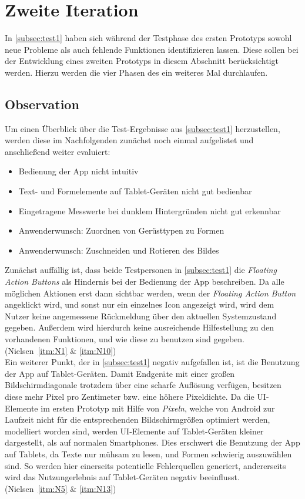 \chapter{Zweite Iteration}\label{chap:pro2}
In \autoref{subsec:test1} haben sich während der Testphase des ersten Prototyps sowohl neue Probleme als auch fehlende Funktionen identifizieren lassen.
Diese sollen bei der Entwicklung eines zweiten Prototyps in diesem Abschnitt berücksichtigt werden. 
Hierzu werden die vier Phasen des \hcdp{} ein weiteres Mal durchlaufen.

\section{Observation}
Um einen Überblick über die Test-Ergebnisse aus \autoref{subsec:test1} herzustellen, werden diese im Nachfolgenden zunächst noch einmal aufgelistet und anschließend weiter evaluiert:

\begin{itemize}
  \item Bedienung der App nicht intuitiv
  \item Text- und Formelemente auf Tablet-Geräten nicht gut bedienbar
  \item Eingetragene Messwerte bei dunklem Hintergründen nicht gut erkennbar
  \item Anwenderwunsch: Zuordnen von Gerüsttypen zu Formen
  \item Anwenderwunsch: Zuschneiden und Rotieren des Bildes
\end{itemize}

\noindent
Zunächst auffällig ist, dass beide Testpersonen in \autoref{subsec:test1} die \emph{Floating Action Buttons} als Hindernis bei der Bedienung der App beschreiben.
Da alle möglichen Aktionen erst dann sichtbar werden, wenn der \emph{Floating Action Button} angeklickt wird, und sonst nur ein einzelnes Icon angezeigt wird, wird dem Nutzer keine angemessene Rückmeldung über den aktuellen Systemzustand gegeben.
Außerdem wird hierdurch keine ausreichende Hilfestellung zu den vorhandenen Funktionen, und wie diese zu benutzen sind gegeben.
(Nielsen~\autoref{itm:N1} \& \autoref{itm:N10}) \\

Ein weiterer Punkt, der in \autoref{subsec:test1} negativ aufgefallen ist, ist die Benutzung der App auf Tablet-Geräten.
Damit Endgeräte mit einer großen Bildschirmdiagonale trotzdem über eine scharfe Auflösung verfügen, besitzen diese mehr Pixel pro Zentimeter bzw. eine höhere Pixeldichte.
Da die UI-Elemente im ersten Prototyp mit Hilfe von \emph{Pixeln}, welche von Android zur Laufzeit nicht für die entsprechenden Bildschirmgrößen optimiert werden, modelliert worden sind, werden UI-Elemente auf Tablet-Geräten kleiner dargestellt, als auf normalen Smartphones.
Dies erschwert die Benutzung der App auf Tablets, da Texte nur mühsam zu lesen, und Formen schwierig auszuwählen sind.
So werden hier einerseits potentielle Fehlerquellen generiert, andererseits wird das Nutzungerlebnis auf Tablet-Geräten negativ beeinflusst.
(Nielsen~\autoref{itm:N5} \& \autoref{itm:N13}) \\

